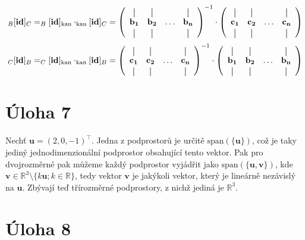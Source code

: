 \documentclass{fkssolpub}
\newcommand*{\vertbar}{\rule[-1ex]{0.5pt}{2.5ex}}
\begin{document}
\[
  _B[\mathbf{id}]_C = _B[\mathbf{id}]_{\text{kan}} \cdot _{\text{kan}}[\mathbf{id}]_C = 
\left(
  \begin{array}{cccc}
    \vertbar & \vertbar &        & \vertbar \\
    \mathbf{b_{1}}    & \mathbf{b_{2}}    & \ldots & \mathbf{b_{n}}    \\
    \vertbar & \vertbar &        & \vertbar 
  \end{array}
\right)^{-1} \cdot 
\left(
  \begin{array}{cccc}
    \vertbar & \vertbar &        & \vertbar \\
    \mathbf{c_{1}}    & \mathbf{c_{2}}    & \ldots & \mathbf{c_{n}}    \\
    \vertbar & \vertbar &        & \vertbar 
  \end{array}
\right)
\]
\[
  _C[\mathbf{id}]_B = _C[\mathbf{id}]_{\text{kan}} \cdot _{\text{kan}}[\mathbf{id}]_B = 
\left(
  \begin{array}{cccc}
    \vertbar & \vertbar &        & \vertbar \\
    \mathbf{c_{1}}    & \mathbf{c_{2}}    & \ldots & \mathbf{c_{n}}    \\
    \vertbar & \vertbar &        & \vertbar 
  \end{array}
\right)^{-1}
\cdot 
\left(
  \begin{array}{cccc}
    \vertbar & \vertbar &        & \vertbar \\
    \mathbf{b_{1}}    & \mathbf{b_{2}}    & \ldots & \mathbf{b_{n}}    \\
    \vertbar & \vertbar &        & \vertbar 
  \end{array}
\right)
\]

\section{Úloha 7}

Nechť $\mathbf{u} = (2, 0, -1)^{\top}$. Jedna z podprostorů je určitě $\text{span}(\{\mathbf{u}\})$, což je taky jediný jednodimenzionální podprostor obsahující tento vektor. Pak pro dvojrozměrné pak můžeme každý podprostor vyjádřit jako $\text{span}(\{\mathbf{u}, \mathbf{v}\})$, kde $\mathbf{v} \in \mathbb{R}^3 \setminus \{k \mathbf{u}; k \in \mathbb{R}\}$, tedy vektor $\mathbf{v}$ je jakýkoli vektor, který je lineárně nezávislý na $\mathbf{u}$. Zbývají teď třírozměrné podprostory, z nichž jediná je $\mathbb{R}^3$.

\section{Úloha 8}
\end{document}
